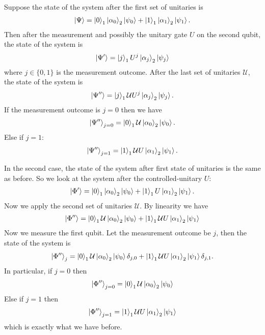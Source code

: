 \documentclass{article}
\theoremstyle{definition}
\newcommand{\al}{\alpha}
\begin{document}
\noindent Suppose the state of the system after the first set of unitaries is 
\begin{align*}
	\ket{\Psi} = \ket{0}_1 \ket{\al_0}_2 \ket{\psi_0} + \ket{1}_1 \ket{\al_1}_2\ket{\psi_1}.
\end{align*}
Then after the measurement and possibly the unitary gate $U$ on the second qubit, the state of the system is 
\begin{align*}
	\ket{\Psi'} = \ket{j}_1 U^j \ket{\al_j}_2 \ket{\psi_j}
\end{align*}
where $j\in \{0,1\}$ is the measurement outcome. After the last set of unitaries $\mathcal{U}$, the state of the system is 
\begin{align*}
	\ket{\Psi''} = \ket{j}_1 \mathcal{U} U^j \ket{\al_j}_2 \ket{\psi_j}.
\end{align*}
If the measurement outcome is $j=0$ then we have
\begin{align*}
	\ket{\Psi''}_{j=0} =  \ket{0}_1 \mathcal{U} \ket{\al_0}_2 \ket{\psi_0}.
\end{align*}
Else if $j=1$:
\begin{align*}
	\ket{\Psi''}_{j=1} =  \ket{1}_1 \mathcal{U} U \ket{\al_1}_2 \ket{\psi_1}.
\end{align*}

In the second case, the state of the system after first state of unitaries is the same as before. So we look at the  system after the controlled-unitary $U$:
\begin{align*}
	\ket{\Phi'} =  \ket{0}_1 \ket{\al_0}_2 \ket{\psi_0} + \ket{1}_1 U \ket{\al_1}_2\ket{\psi_1}.
\end{align*}
Now we apply the second set of unitaries $\mathcal{U}$. By linearity we have
\begin{align*}
		\ket{\Phi''} = \ket{0}_1 \mathcal{U} \ket{\al_0}_2 \ket{\psi_0} + \ket{1}_1 \mathcal{U} U \ket{\al_1}_2\ket{\psi_1}
\end{align*}
Now we measure the first qubit. Let the measurement outcome be $j$, then the state of the system is 
\begin{align*}
	\ket{\Phi''}_{j} = \ket{0}_1 \mathcal{U} \ket{\al_0}_2 \ket{\psi_0} \delta_{j,0} + \ket{1}_1 \mathcal{U} U \ket{\al_1}_2\ket{\psi_1} \delta_{j,1}.
\end{align*}
In particular, if $j=0$ then 
\begin{align*}
		\ket{\Phi''}_{j=0} = \ket{0}_1 \mathcal{U} \ket{\al_0}_2 \ket{\psi_0}
\end{align*}
Else if $j=1$ then
\begin{align*}
	\ket{\Phi''}_{j=1} = \ket{1}_1 \mathcal{U} U \ket{\al_1}_2 \ket{\psi_1}
\end{align*}
which is exactly what we have before. 
\end{document}

